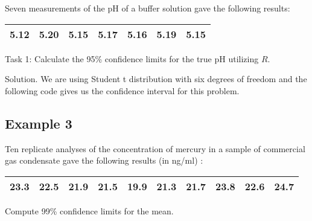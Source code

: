 Seven measurements of the pH of a buffer solution gave the
following results:

\begin{center}
\begin{tabular}{|c|c|c|c|c|c|c|}
\hline
5.12 & 5.20 & 5.15 & 5.17 & 5.16 & 5.19 & 5.15\\
\hline
\end{tabular}
\end{center}


Task 1: Calculate the 95\% confidence limits for the true pH
utilizing $R$.


Solution. We are using Student t distribution with six degrees of
freedom and the following code gives us the confidence interval
for this problem.

\subsection{Example 3} Ten replicate analyses of the concentration
of mercury in a sample of commercial gas condensate gave the
following results (in ng/ml) :

\begin{center}
\begin{tabular}{|c|c|c|c|c|c|c|c|c|c|}
\hline
23.3 & 22.5 & 21.9 & 21.5 & 19.9 & 21.3 & 21.7 & 23.8 & 22.6 &
24.7\\
\hline
\end{tabular}
\end{center}

Compute 99\% confidence limits for the mean.


\newpage

